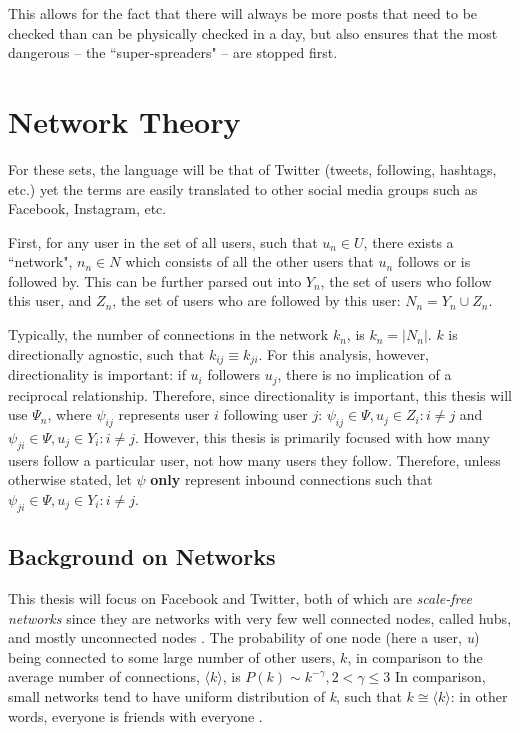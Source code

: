\documentclass[preprint,review,12pt]{elsarticle}
\begin{document}
  This allows for the fact that there will always be more posts that need to be checked than can be physically checked in a day, but also ensures that the most dangerous -- the ``super-spreaders" -- are stopped first.
  


\section{Network Theory}
For these sets, the language will be that of Twitter (tweets, following, hashtags, etc.) yet the terms are easily translated to other social media groups such as Facebook, Instagram, etc.

First, for any user in the set of all users, such that $u_n \in U$, there exists a ``network", $n_n \in N$ which consists of all the other users that $u_n$ follows or is followed by. This can be further parsed out into $Y_n$, the set of users who follow this user, and $Z_n$, the set of users who are followed by this user:  $N_n = Y_n \cup Z_n$. 

Typically, the number of connections in the network $k_n$, is $k_n = |N_n|$. $k$ is directionally agnostic, such that $k_{ij} \equiv k_{ji}$. For this analysis, however, directionality is important: if $u_i$ followers $u_j$, there is no implication of a reciprocal relationship. Therefore, since directionality is important, this thesis will use $\Psi_n$, where $\psi_{ij}$ represents user $i$ following user $j$: $\psi_{ij} \in \Psi, u_j \in Z_i: i \neq j$ and $\psi_{ji} \in \Psi, u_j \in Y_i: i \neq j$. However, this thesis is primarily focused with how many users follow a particular user, not how many users they follow. Therefore, unless otherwise stated, let $\psi$ \textbf{only} represent inbound connections such that $\psi_{ji} \in \Psi, u_j \in Y_i: i \neq j$.
    

\subsection{Background on Networks}
\label{sec: Background on Networks}
This thesis will focus on Facebook and Twitter, both of which are \textit{scale-free networks} \cite{aparicio2015model,broido2019scale,barabasi2000scale} since they are networks with very few well connected nodes, called hubs, and mostly unconnected nodes \cite{barabasi2009scale,barabasi1999emergence,dorogovtsev2002evolution}. The probability of one node (here a user, \textit{u}) being connected to some large number of other users, $k$, in comparison to the average number of connections, $\langle k \rangle$, is $P(k) \sim k^{-\gamma}, 2 < \gamma \leq 3$
In comparison, small networks tend to have uniform distribution of \textit{k}, such that $k \cong \langle k \rangle$: in other words, everyone is friends with everyone \cite{erdHos1960evolution,watts1998collective}.
\end{document}
